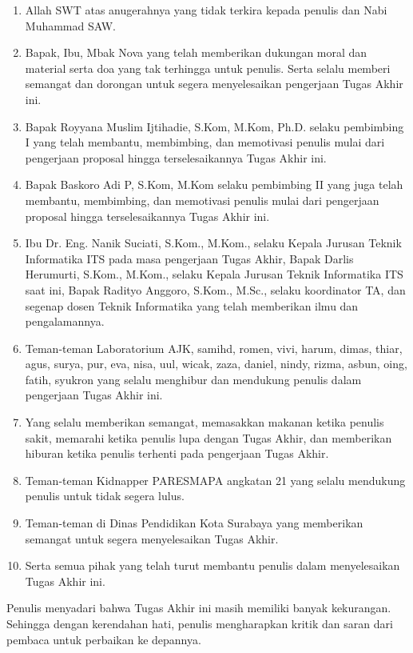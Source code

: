 \documentclass{ta-its}
\begin{document}
        \begin{enumerate}
        	\item Allah SWT atas anugerahnya yang tidak terkira kepada penulis dan Nabi Muhammad SAW.
        	\item Bapak, Ibu, Mbak Nova yang telah memberikan dukungan moral dan material serta doa yang tak terhingga untuk penulis. Serta selalu memberi semangat dan dorongan untuk segera menyelesaikan pengerjaan Tugas Akhir ini.
        	\item Bapak Royyana Muslim Ijtihadie, S.Kom, M.Kom, Ph.D. selaku pembimbing I yang telah membantu, membimbing, dan memotivasi penulis mulai dari pengerjaan proposal hingga terselesaikannya Tugas Akhir ini.
        	\item Bapak Baskoro Adi P, S.Kom, M.Kom selaku pembimbing II yang juga telah membantu, membimbing, dan memotivasi penulis mulai dari pengerjaan proposal hingga terselesaikannya Tugas Akhir ini.
        	\item Ibu Dr. Eng. Nanik Suciati, S.Kom., M.Kom., selaku Kepala Jurusan Teknik Informatika ITS pada masa pengerjaan Tugas Akhir, Bapak Darlis Herumurti, S.Kom., M.Kom., selaku Kepala Jurusan Teknik Informatika ITS saat ini, Bapak Radityo Anggoro, S.Kom., M.Sc., selaku koordinator TA, dan segenap dosen Teknik Informatika yang telah memberikan ilmu dan pengalamannya.
        	\item Teman-teman Laboratorium AJK, samihd, romen, vivi, harum, dimas, thiar, agus, surya, pur, eva, nisa, uul, wicak, zaza, daniel, nindy, rizma, asbun, oing, fatih, syukron yang selalu menghibur dan mendukung penulis dalam pengerjaan Tugas Akhir ini.
        	\item Yang selalu memberikan semangat, memasakkan makanan ketika penulis sakit, memarahi ketika penulis lupa dengan Tugas Akhir, dan memberikan hiburan ketika penulis terhenti pada pengerjaan Tugas Akhir.
        	\item Teman-teman Kidnapper PARESMAPA angkatan 21 yang selalu mendukung penulis untuk tidak segera lulus.
        	\item Teman-teman di Dinas Pendidikan Kota Surabaya yang memberikan semangat untuk segera menyelesaikan Tugas Akhir.
        	\item Serta semua pihak yang telah turut membantu penulis dalam menyelesaikan Tugas Akhir ini.
        \end{enumerate}
        
        Penulis menyadari bahwa Tugas Akhir ini masih memiliki banyak kekurangan. Sehingga dengan kerendahan hati, penulis mengharapkan kritik dan saran dari pembaca untuk perbaikan ke depannya.
        
\end{document}
